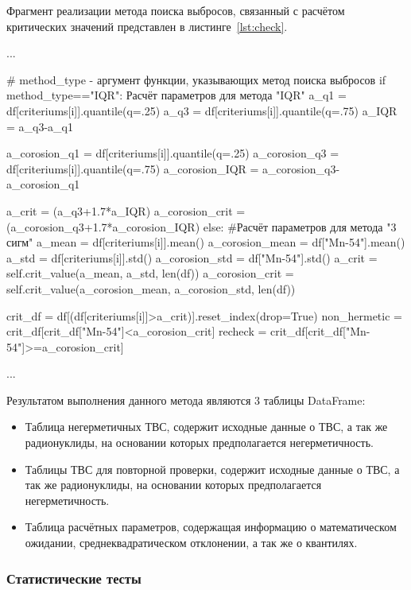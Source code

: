 Фрагмент реализации метода поиска выбросов, связанный с расчётом критических значений представлен в листинге~\ref{lst:check}.

\begin{flushleft}
	 \label{lst:check}
	\begin{MyCodes}
...

# method_type - аргумент функции, указывающих метод поиска выбросов
if method_type=="IQR":
Расчёт параметров для метода "IQR"
	a_q1 = df[criteriums[i]].quantile(q=.25)
	a_q3 = df[criteriums[i]].quantile(q=.75)
	a_IQR = a_q3-a_q1
	
	a_corosion_q1 = df[criteriums[i]].quantile(q=.25)
	a_corosion_q3 = df[criteriums[i]].quantile(q=.75)
	a_corosion_IQR = a_corosion_q3-a_corosion_q1
	
	a_crit = (a_q3+1.7*a_IQR)
	a_corosion_crit = (a_corosion_q3+1.7*a_corosion_IQR)
else:
	#Расчёт параметров для метода "3 сигм"
	a_mean = df[criteriums[i]].mean()
	a_corosion_mean = df["Mn-54"].mean()
	a_std = df[criteriums[i]].std()
	a_corosion_std = df["Mn-54"].std()
	a_crit = self.crit_value(a_mean, a_std, len(df))
	a_corosion_crit = self.crit_value(a_corosion_mean, a_corosion_std, len(df))

crit_df = df[(df[criteriums[i]]>a_crit)].reset_index(drop=True)
non_hermetic = crit_df[crit_df["Mn-54"]<a_corosion_crit]
recheck = crit_df[crit_df["Mn-54"]>=a_corosion_crit]

...
	\end{MyCodes}
\end{flushleft}

Результатом выполнения данного метода являются 3 таблицы DataFrame:
\begin{itemize}
	\item Таблица негерметичных ТВС, содержит исходные данные о ТВС, а так же радионуклиды, на основании которых предполагается негерметичность.
	\item Таблицы ТВС для повторной проверки, содержит исходные данные о ТВС, а так же радионуклиды, на основании которых предполагается негерметичность.
	\item Таблица расчётных параметров, содержащая информацию о математическом ожидании, среднеквадратическом отклонении, а так же о квантилях.
\end{itemize}

\subsubsection{Статистические тесты}

